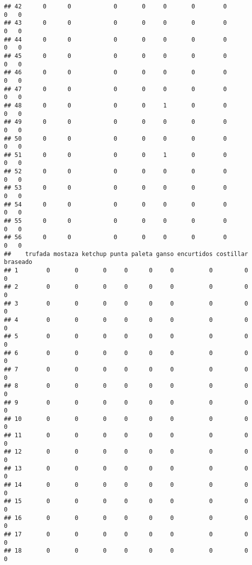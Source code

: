 \documentclass[
]{article}
\begin{document}
\begin{verbatim}
## 42      0      0            0       0     0       0        0         0   0
## 43      0      0            0       0     0       0        0         0   0
## 44      0      0            0       0     0       0        0         0   0
## 45      0      0            0       0     0       0        0         0   0
## 46      0      0            0       0     0       0        0         0   0
## 47      0      0            0       0     0       0        0         0   0
## 48      0      0            0       0     1       0        0         0   0
## 49      0      0            0       0     0       0        0         0   0
## 50      0      0            0       0     0       0        0         0   0
## 51      0      0            0       0     1       0        0         0   0
## 52      0      0            0       0     0       0        0         0   0
## 53      0      0            0       0     0       0        0         0   0
## 54      0      0            0       0     0       0        0         0   0
## 55      0      0            0       0     0       0        0         0   0
## 56      0      0            0       0     0       0        0         0   0
##    trufada mostaza ketchup punta paleta ganso encurtidos costillar braseado
## 1        0       0       0     0      0     0          0         0        0
## 2        0       0       0     0      0     0          0         0        0
## 3        0       0       0     0      0     0          0         0        0
## 4        0       0       0     0      0     0          0         0        0
## 5        0       0       0     0      0     0          0         0        0
## 6        0       0       0     0      0     0          0         0        0
## 7        0       0       0     0      0     0          0         0        0
## 8        0       0       0     0      0     0          0         0        0
## 9        0       0       0     0      0     0          0         0        0
## 10       0       0       0     0      0     0          0         0        0
## 11       0       0       0     0      0     0          0         0        0
## 12       0       0       0     0      0     0          0         0        0
## 13       0       0       0     0      0     0          0         0        0
## 14       0       0       0     0      0     0          0         0        0
## 15       0       0       0     0      0     0          0         0        0
## 16       0       0       0     0      0     0          0         0        0
## 17       0       0       0     0      0     0          0         0        0
## 18       0       0       0     0      0     0          0         0        0

\end{verbatim}
\end{document}
